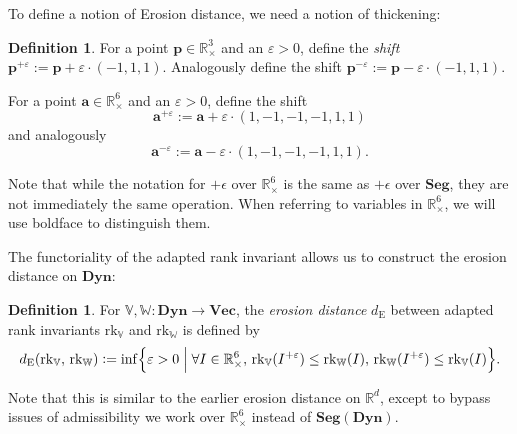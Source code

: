 \documentclass[a4paper,UKenglish,thm-restate]{article}
\theoremstyle{definition}
\newtheorem{definition}[theorem]{Definition}
\def\bbv{\mathbb{V}}
\def\bbw{\mathbb{W}}
\def\bdyn{\mathbf{Dyn}}
\def\bvec{\mathbf{Vec}}
\newcommand{\defeq}{\vcentcolon=}
\begin{document}
        To define a notion of Erosion distance, we need a notion of thickening:
        \begin{definition}
            For a point $\mathbf{p} \in \mathbb{R}_{\times}^3$ and an $\varepsilon > 0$, define the \emph{shift} $\mathbf{p}^{+\varepsilon} := \mathbf{p} + \varepsilon \cdot (-1, 1, 1)$. Analogously define the shift $\mathbf{p}^{-\varepsilon} := \mathbf{p} - \varepsilon \cdot (-1, 1, 1)$.

            For a point $\mathbf{a} \in \mathbb{R}_{\times}^6$ and an $\varepsilon > 0$, define the shift 
            \[ \mathbf{a}^{+\varepsilon} := \mathbf{a} + \varepsilon \cdot (1, -1, -1, -1, 1, 1) \]
            and analogously 
            \[ \mathbf{a}^{-\varepsilon} := \mathbf{a} - \varepsilon \cdot (1, -1, -1, -1, 1, 1). \]
        \end{definition}
        Note that while the notation for $+\epsilon$ over $\mathbb{R}_{\times}^6$ is the same as $+\epsilon$ over $\mathbf{Seg}$, they are not immediately the same operation. When referring to variables in $\mathbb{R}_{\times}^6$, we will use boldface to distinguish them.
        
        The functoriality of the adapted rank invariant allows us to construct the erosion distance on $\bdyn$:
        \begin{definition}
            For $\bbv, \bbw: \bdyn \rightarrow \bvec$, the \emph{erosion distance} $d_\text{E}$ between adapted rank invariants $\mathrm{rk}_\mathbb{V}$ and $\mathrm{rk}_\mathbb{W}$ is defined by
            \[
            d_\text{E}(\mathrm{rk}_\mathbb{V},\,\mathrm{rk}_\mathbb{W}) \defeq \inf\Bigl\{ \varepsilon>0\;\Bigr\rvert \; \forall I\in \mathbb{R}_{\times}^6,\, \mathrm{rk}_\mathbb{V}(I^{+\varepsilon})\leq \mathrm{rk}_\mathbb{W}(I) ,\, \mathrm{rk}_\mathbb{W}(I^{+\varepsilon})\leq \mathrm{rk}_\mathbb{V}(I) \Bigr\}.
            \]
        \end{definition}
        Note that this is similar to the earlier erosion distance on $\mathbb{R}^d$, except to bypass issues of admissibility we work over $\mathbb{R}_{\times}^6$ instead of $\mathbf{Seg}(\bdyn)$.
    
\end{document}
